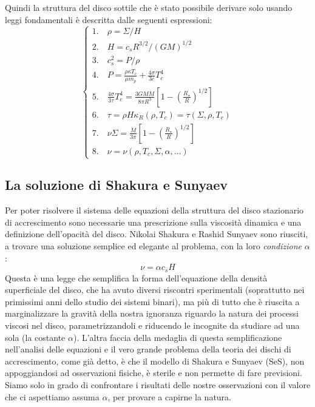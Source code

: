 \documentclass[a4paperbi]{article}
\begin{document}
	Quindi la struttura del disco sottile che è stato possibile derivare solo usando leggi fondamentali è descritta dalle seguenti espressioni:
	\begin{equation}
	\begin{cases}
		1.\quad \rho=\Sigma/H\\
		2.\quad H=c_sR^{3/2}/(GM)^{1/2}\\
		3.\quad c_s^2=P/\rho\\
		4.\quad P=\frac{\rho\kappa T_c}{\mu m_p}+\frac{4\sigma}{3c}T_c^4\\
		5.\quad \frac{4\sigma}{3\tau}T^4_c=\frac{3GM\dot{M}}{8\pi R^3}\left[1-\left(\frac{R_{\star}}{R}\right)^{1/2}\right]\\
		6.\quad \tau=\rho H\kappa_R(\rho,T_c)=\tau(\Sigma,\rho,T_c)\\
		7.\quad \nu\Sigma=\frac{\dot{M}}{3\pi}\left[1-\left(\frac{R_{\star}}{R}\right)^{1/2}\right]\\
		8.\quad \nu=\nu(\rho,T_c,\Sigma,\alpha,...)		
	\end{cases}
	\end{equation}
		
\subsection{La soluzione di Shakura e Sunyaev}
	Per poter risolvere il sistema delle equazioni della struttura del disco stazionario di accrescimento sono necessarie una prescrizione sulla viscosità dinamica e una definizione dell'opacità del disco. Nikolai Shakura e Rashid Sunyaev sono riusciti, a trovare una soluzione semplice ed elegante al problema, con la loro \textit{condizione} $\alpha$:
	\begin{equation}
		\nu=\alpha c_sH
	\end{equation}
Questa è una legge che semplifica la forma dell'equazione della densità superficiale del disco, che ha avuto diversi riscontri sperimentali (soprattutto nei primissimi anni dello studio dei sistemi binari), ma più di tutto che è riuscita a marginalizzare la gravità della nostra ignoranza riguardo la natura dei processi viscosi nel disco, parametrizzandoli e riducendo le incognite da studiare ad una sola (la costante $\alpha$). L'altra faccia della medaglia di questa semplificazione nell'analisi delle equazioni e il vero grande problema della teoria dei dischi di accrescimento, come già detto, è che il modello di Shakura e Sunyaev (SeS), non appoggiandosi ad osservazioni fisiche, è sterile e non permette di fare previsioni. Siamo solo in grado di confrontare i risultati delle nostre osservazioni con il valore che ci aspettiamo assuma $\alpha$, per provare a capirne la natura.
\end{document}
